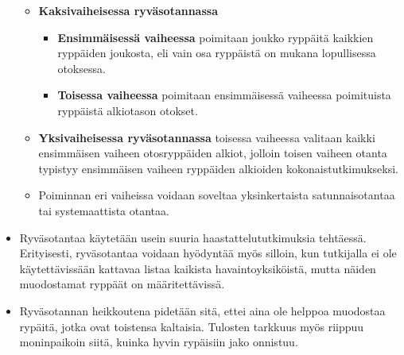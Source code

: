 \documentclass[
]{book}
\providecommand{\tightlist}{%
  \setlength{\itemsep}{0pt}\setlength{\parskip}{0pt}}
\begin{document}
\begin{itemize}
  \begin{itemize}
  \tightlist
  \item
    \textbf{Kaksivaiheisessa ryväsotannassa}

    \begin{itemize}
    \tightlist
    \item
      \textbf{Ensimmäisessä vaiheessa} poimitaan joukko ryppäitä kaikkien ryppäiden joukosta, eli vain osa ryppäistä on mukana lopullisessa otoksessa.\\
    \item
      \textbf{Toisessa vaiheessa} poimitaan ensimmäisessä vaiheessa poimituista ryppäistä alkiotason otokset.
    \end{itemize}
  \item
    \textbf{Yksivaiheisessa ryväsotannassa} toisessa vaiheessa valitaan kaikki ensimmäisen vaiheen otosryppäiden alkiot, jolloin toisen vaiheen otanta typistyy ensimmäisen vaiheen ryppäiden alkioiden kokonaistutkimukseksi.
  \item
    Poiminnan eri vaiheissa voidaan soveltaa yksinkertaista satunnaisotantaa tai systemaattista otantaa.
  \end{itemize}
\item
  Ryväsotantaa käytetään usein suuria haastattelututkimuksia tehtäessä. Erityisesti, ryväsotantaa voidaan hyödyntää myös silloin, kun tutkijalla ei ole käytettävissään kattavaa listaa kaikista havaintoyksiköistä, mutta näiden muodostamat ryppäät on määritettävissä.
\item
  Ryväsotannan heikkoutena pidetään sitä, ettei aina ole helppoa muodostaa rypäitä, jotka ovat toistensa kaltaisia. Tulosten tarkkuus myös riippuu moninpaikoin siitä, kuinka hyvin rypäisiin jako onnistuu.
\end{itemize}
\end{document}
